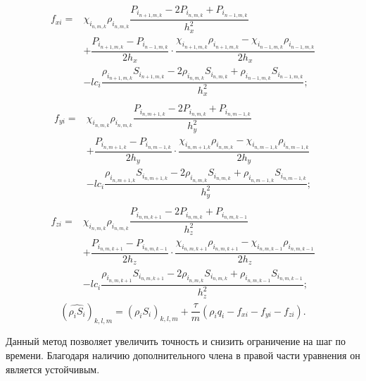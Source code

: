 \begin{eqnarray*}
  \begin{aligned}
    f_{xi} =& \chi_{i_{n,m,k}} \rho_{i_{n,m,k}} \dfrac{P_{i_{n+1,m,k}} - 2P_{i_{n,m,k}} + P_{i_{n-1,m,k}}}{h_x^2} \\
    &+ \dfrac{P_{i_{n+1,m,k}}-P_{i_{n-1,m,k}}}{2h_x} \cdot \dfrac{\chi_{i_{n+1,m,k}} \rho_{i_{n+1,m,k}}-\chi_{i_{n-1,m,k}} \rho_{i_{n-1,m,k}}}{2h_x} \\
    &- lc_i\dfrac{\rho_{i_{n+1,m,k}}S_{i_{n+1,m,k}} - 2\rho_{i_{n,m,k}}S_{i_{n,m,k}} + \rho_{i_{n-1,m,k}}S_{i_{n-1,m,k}}}{h_x^2};
  \end{aligned}
\end{eqnarray*}
\begin{eqnarray*}
  \begin{aligned}
    f_{yi} =& \chi_{i_{n,m,k}} \rho_{i_{n,m,k}} \dfrac{P_{i_{n,m+1,k}} - 2P_{i_{n,m,k}} + P_{i_{n,m-1,k}}}{h_y^2} \\
    &+ \dfrac{P_{i_{n,m+1,k}}-P_{i_{n,m-1,k}}}{2h_y} \cdot \dfrac{\chi_{i_{n,m+1,k}} \rho_{i_{n,m,k}}-\chi_{i_{n,m-1,k}} \rho_{i_{n,m-1,k}}}{2h_y} \\
    &- lc_i\dfrac{\rho_{i_{n,m+1,k}}S_{i_{n,m+1,k}} - 2\rho_{i_{n,m,k}}S_{i_{n,m,k}} + \rho_{i_{n,m-1,k}}S_{i_{n,m-1,k}}}{h_y^2};
  \end{aligned}
    \end{eqnarray*}
\begin{eqnarray*}
  \begin{aligned}
    f_{zi} =& \chi_{i_{n,m,k}} \rho_{i_{n,m,k}} \dfrac{P_{i_{n,m,k+1}} - 2P_{i_{n,m,k}} + P_{i_{n,m,k-1}}}{h_z^2} \\
    &+ \dfrac{P_{i_{n,m,k+1}}-P_{i_{n,m,k-1}}}{2h_z} \cdot \dfrac{\chi_{i_{n,m,k+1}} \rho_{i_{n,m,k+1}}-\chi_{i_{n,m,k-1}} \rho_{i_{n,m,k-1}}}{2h_z} \\
    &- lc_i\dfrac{\rho_{i_{n,m,k+1}}S_{i_{n,m,k+1}} - 2\rho_{i_{n,m,k}}S_{i_{n,m,k}} + \rho_{i_{n,m,k-1}}S_{i_{n,m,k-1}}}{h_z^2};
  \end{aligned}
\end{eqnarray*}
\begin{equation*}
    (\widehat{\rho_i S_i})_{k,l,m}=(\rho_i S_i)_{k,l,m}+\frac{\tau}{m}(\rho_i q_i - f_{xi} - f_{yi} - f_{zi}).
\end{equation*}

Данный метод позволяет увеличить точность и снизить ограничение
на шаг по времени. Благодаря наличию дополнительного члена в правой
части уравнения он является устойчивым.

